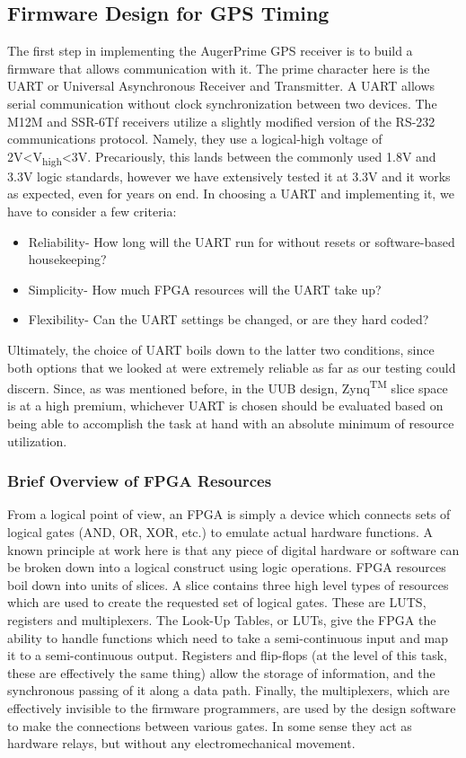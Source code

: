 \subsection{Firmware Design for GPS Timing}
The first step in implementing the AugerPrime GPS receiver is to build a firmware that allows communication with it. The prime character here is the UART or Universal Asynchronous Receiver and Transmitter. A UART allows serial communication without clock synchronization between two devices. The M12M and SSR-6Tf receivers utilize a slightly modified version of the RS-232 communications protocol. Namely, they use a logical-high voltage of 2V\textless V\textsubscript{high}\textless 3V. Precariously, this lands between the commonly used 1.8V and 3.3V logic standards, however we have extensively tested it at 3.3V and it works as expected, even for years on end. In choosing a UART and implementing it, we have to consider a few criteria:
\begin{itemize}
\item Reliability- How long will the UART run for without resets or software-based housekeeping?
\item Simplicity- How much FPGA resources will the UART take up?
\item Flexibility- Can the UART settings be changed, or are they hard coded?
\end{itemize}
Ultimately, the choice of UART boils down to the latter two conditions, since both options that we looked at were extremely reliable as far as our testing could discern. Since, as was mentioned before, in the UUB design, Zynq\textsuperscript{TM} slice space is at a high premium, whichever UART is chosen should be evaluated based on being able to accomplish the task at hand with an absolute minimum of resource utilization. 
\subsubsection{Brief Overview of FPGA Resources}
From a logical point of view, an FPGA is simply a device which connects sets of logical gates (AND, OR, XOR, etc.) to emulate actual hardware functions. A known principle at work here is that any piece of digital hardware or software can be broken down into a logical construct using logic operations. FPGA resources boil down into units of slices. A slice contains three high level types of resources which are used to create the requested set of logical gates. These are LUTS, registers and multiplexers. The Look-Up Tables, or LUTs, give the FPGA the ability to handle functions which need to take a semi-continuous input and map it to a semi-continuous output. Registers and flip-flops (at the level of this task, these are effectively the same thing) allow the storage of information, and the synchronous passing of it along a data path. Finally, the multiplexers, which are effectively invisible to the firmware programmers, are used by the design software to make the connections between various gates. In some sense they act as hardware relays, but without any electromechanical movement.
